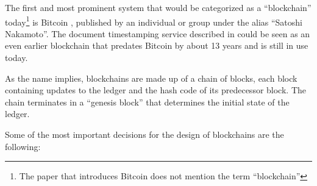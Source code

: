 The first and most prominent system that would be categorized as a
``blockchain'' today\footnote{The paper that introduces Bitcoin does not
mention the term ``blockchain''} is Bitcoin \cite{nakamoto2008bitcoin},
published by an individual or group under the alias ``Satoshi Nakamoto''.  The
document timestamping service described in \cite{haber1990time} could be seen
as an even earlier blockchain that predates Bitcoin by about 13
years and is still in use today.

As the name implies, blockchains are made up of a chain of blocks, each block
containing updates to the ledger and the hash code of its predecessor block. The
chain terminates in a ``genesis block'' that determines the initial state of
the ledger.

Some of the most important decisions for the design of blockchains are the following:
